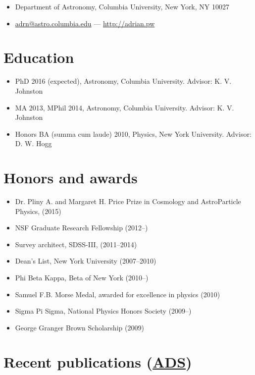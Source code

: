 \documentclass[12pt,letterpaper]{article}
\begin{document}
\thispagestyle{empty}\sloppy\sloppypar

{\huge \name}
\vspace{-0.5em}

\begin{itemize}
  \item Department of Astronomy, Columbia University, New York, NY 10027
  \item \href{mailto:adrn@astro.columbia.edu}{adrn@astro.columbia.edu} ---
		\href{http://adrian.pw}{http://adrian.pw}
\end{itemize}

\section*{Education}
	\begin{itemize}
	\item PhD 2016 (expected), Astronomy, Columbia University.
		{Advisor: K. V. Johnston}
	\item MA 2013, MPhil 2014, Astronomy, Columbia University.
		{Advisor: K. V. Johnston}
	\item Honors BA (summa cum laude) 2010, Physics, New York University.
		{Advisor: D. W. Hogg}
	\end{itemize}


\section*{Honors and awards}

	\begin{itemize}
        \item Dr. Pliny A. and Margaret H. Price Prize in Cosmology and AstroParticle Physics, (2015)
	\item NSF Graduate Research Fellowship (2012--)
	\item Survey architect, SDSS-III, (2011--2014)
	\item Dean's List, New York University (2007--2010)
	\item Phi Beta Kappa, Beta of New York (2010--)
	\item Samuel F.B. Morse Medal, awarded for excellence in physics (2010)
	\item Sigma Pi Sigma, National Physics Honors Society (2009--)
	\item George Granger Brown Scholarship (2009)
	\end{itemize}

\section*{Recent publications (\href{\adsurl}{ADS})}
\end{document}
